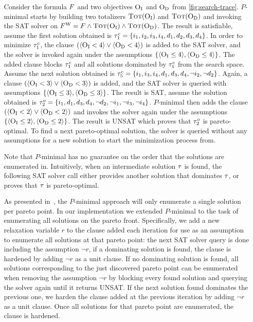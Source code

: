 \begin{example}\label{ex:pmin}
  Consider the formula $F$ and two objectives $\textsc{O}_{\text{I}}$ and $\textsc{O}_{\text{D}}$ from \cref{fig:search-trace}.
  $P$-minimal starts by building two totalizers $\textsc{Tot}(\textsc{O}_{\text{I}})$ and $\textsc{Tot}(\textsc{O}_{\text{D}})$ and invoking the SAT solver on $F^\text{W} = F \land \textsc{Tot}(\textsc{O}_{\text{I}}) \land \textsc{Tot}(\textsc{O}_{\text{D}})$.
  The result is satisfiable, assume the first solution obtained is $\tau^c_1 = {\{i_1,\allowbreak i_2,\allowbreak i_3,\allowbreak i_4,\allowbreak d_1,\allowbreak d_2,\allowbreak d_3,\allowbreak d_4\}}$. 
  In order to minimize $\tau^c_1$, the clause $(\langle \textsc{O}_{\text{I}} < 4 \rangle \lor \langle \textsc{O}_{\text{D}} < 4 \rangle)$ is added to the SAT solver, and the solver is invoked again under the assumptions $\{ \langle \textsc{O}_{\text{I}} \leq 4 \rangle, \langle \textsc{O}_{\text{D}} \leq 4 \rangle \}$.
  The added clause blocks $\tau^c_1$ and all solutions dominated by $\tau^c_1$ from the search space.
  Assume the next solution obtained is $\tau^c_5 = {\{i_1,\allowbreak i_3,\allowbreak i_4,\allowbreak d_1,\allowbreak d_3,\allowbreak d_4,\allowbreak \lnot i_2,\allowbreak \lnot d_2\}}$. 
  Again, a clause $(\langle \textsc{O}_{\text{I}} < 3 \rangle \lor \langle \textsc{O}_{\text{D}} < 3 \rangle)$ is added, and the SAT solver is queried with assumptions $\{ \langle \textsc{O}_{\text{I}} \leq 3 \rangle, \langle \textsc{O}_{\text{D}} \leq 3 \rangle \}$.
  The result is SAT, assume the solution obtained is $\tau^o_2 = {\{i_1,\allowbreak d_1,\allowbreak d_3,\allowbreak d_4,\allowbreak \lnot d_2,\allowbreak \lnot i_1,\allowbreak \lnot i_3,\allowbreak \lnot i_4\}}$. 
  $P$-minimal then adds the clause $(\langle \textsc{O}_{\text{I}} < 2 \rangle \lor \langle \textsc{O}_{\text{D}} < 2 \rangle)$ and invokes the solver again under the assumptions $\{ \langle \textsc{O}_{\text{I}} \leq 2 \rangle, \langle \textsc{O}_{\text{D}} \leq 2 \rangle \}$.
  The result is UNSAT which proves that $\tau^o_2$ is pareto-optimal. 
  To find a next pareto-optimal solution, the solver is queried without any assumptions for a new solution to start the minimization process from.
\end{example}

Note that $P$-minimal has no guarantee on the order that the solutions are enumerated in. 
Intuitively, when an intermediate solution $\tau$ is found, the following SAT solver call either provides another solution that dominates $\tau$, or proves that $\tau$ is pareto-optimal.  

As presented in~\cite{DBLP:conf/cp/SohBTB17}, the $P$-minimal approach will only enumerate a single solution per pareto point.
In our implementation we extended $P$-minimal to the task of enumerating all solutions on the pareto front.
Specifically, we add a new relaxation variable $r$ to the clause added each iteration for use as an assumption to enumerate all solutions at that pareto point:
the next SAT solver query is done including the assumption $\lnot r$, if a dominating solution is found, the clause is hardened by adding $\lnot r$ as a unit clause.
If no dominating solution is found, all solutions corresponding to the just discovered pareto point can be enumerated when removing the assumption $\lnot r$ by blocking every found solution and querying the solver again until it returns UNSAT.
If the next solution found dominates the previous one, we harden the clause added at the previous iteration by adding $\lnot r$ as a unit clause.
Once all solutions for that pareto point are enumerated, the clause is hardened.

